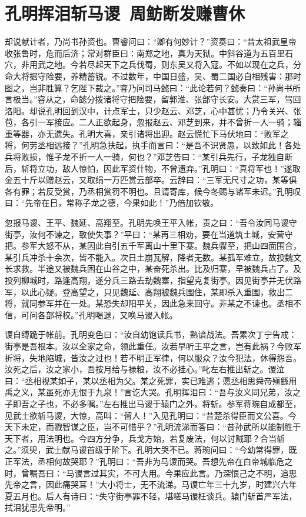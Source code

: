 \chapter{孔明挥泪斩马谡~周鲂断发赚曹休}

却说献计者，乃尚书孙资也。曹睿问曰：“卿有何妙计？”资奏曰：“昔太祖武皇帝收张鲁时，危而后济；常对群臣曰：南郑之地，真为天狱。中斜谷道为五百里石穴，非用武之地。今若尽起天下之兵伐蜀，则东吴又将入寇。不如以现在之兵，分命大将据守险要，养精蓄锐。不过数年，中国日盛，吴、蜀二国必自相残害：那时图之，岂非胜算？乞陛下裁之。”睿乃问司马懿曰：“此论若何？懿奏曰：“孙尚书所言极当。”睿从之，命懿分拨诸将守把险要，留郭淮、张郃守长安。大赏三军，驾回洛阳。却说孔明回到汉中，计点军士，只少赵云、邓芝，心中甚忧；乃令关兴、张苞，各引一军接应。二人正欲起身，忽报赵云、邓芝到来，并不曾折一人一骑；辎重等器，亦无遗失。孔明大喜，亲引诸将出迎。赵云慌忙下马伏地曰：“败军之将，何劳丞相远接？”孔明急扶起，执手而言曰：“是吾不识贤愚，以致如此！各处兵将败损，惟子龙不折一人一骑，何也？”邓芝告曰：“某引兵先行，子龙独自断后，斩将立功，敌人惊怕，因此军资什物，不曾遗弃。”孔明曰：“真将军也！”遂取金五十斤以赠赵云，又取绢一万匹赏云部卒。云辞曰：“三军无尺寸之功，某等俱各有罪；若反受赏，乃丞相赏罚不明也。且请寄库，候今冬赐与诸军未迟。”孔明叹曰：“先帝在日，常称子龙之德，今果如此！”乃倍加钦敬。

忽报马谡、王平、魏延、高翔至。孔明先唤王平入帐，责之曰：“吾令汝同马谡守街亭，汝何不谏之，致使失事？”平曰：“某再三相劝，要在当道筑土城，安营守把。参军大怒不从，某因此自引五千军离山十里下寨。魏兵骤至，把山四面围合，某引兵冲杀十余次，皆不能入。次日土崩瓦解，降者无数。某孤军难立，故投魏文长求救。半途又被魏兵困在山谷之中，某奋死杀出。比及归寨，早被魏兵占了。及投列柳城时，路逢高翔，遂分兵三路去劫魏寨，指望克复街亭。因见街亭并无伏路军，以此心疑。登高望之，只见魏延、高翔被魏兵围住，某即杀入重围，救出二将，就同参军并在一处。某恐失却阳平关，因此急来回守。非某之不谏也。丞相不信，可问各部将校。”孔明喝退，又唤马谡入帐。

谡自缚跪于帐前。孔明变色曰：“汝自幼饱读兵书，熟谙战法。吾累次丁宁告戒：街亭是吾根本。汝以全家之命，领此重任。汝若早听王平之言，岂有此祸？今败军折将，失地陷城，皆汝之过也！若不明正军律，何以服众？汝今犯法，休得怨吾。汝死之后，汝之家小，吾按月给与禄粮，汝不必挂心。”叱左右推出斩之。谡泣曰：“丞相视某如子，某以丞相为父。某之死罪，实已难逃；愿丞相思舜帝殛鲧用禹之义，某虽死亦无恨于九泉！”言讫大哭。孔明挥泪曰：“吾与汝义同兄弟，汝之子即吾之子也，不必多嘱。”左右推出马谡于辕门之外，将斩。参军蒋琬自成都至，见武士欲斩马谡，大惊，高叫：“留人！”入见孔明曰：“昔楚杀得臣而文公喜。今天下未定，而戮智谋之臣，岂不可惜乎？”孔明流涕而答曰：“昔孙武所以能制胜于天下者，用法明也。今四方分争，兵戈方始，若复废法，何以讨贼耶？合当斩之。”须臾，武士献马谡首级于阶下。孔明大哭不已。蒋琬问曰：“今幼常得罪，既正军法，丞相何故哭耶？”孔明曰：“吾非为马谡而哭。吾想先帝在白帝城临危之时，曾嘱吾曰：“马谡言过其实，不可大用。今果应此言。乃深恨己之不明，追思先帝之言，因此痛哭耳！”大小将士，无不流涕。马谡亡年三十九岁，时建兴六年夏五月也。后人有诗曰：“失守街亭罪不轻，堪嗟马谡枉谈兵。辕门斩首严军法，拭泪犹思先帝明。”

